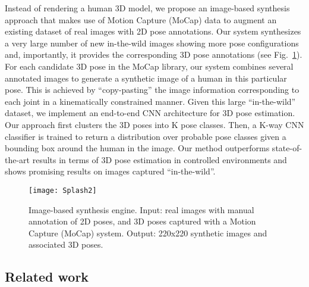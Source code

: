 \documentclass{article}
\begin{document}
Instead of rendering a human 3D model, we propose
an image-based synthesis approach that makes use of Motion Capture
(MoCap) data to augment an existing dataset of real images with 2D
pose annotations. Our system synthesizes a very large number of new
in-the-wild images showing more pose configurations and, importantly,
it provides the corresponding 3D pose annotations (see
Fig.~\ref{fig:dataset}).
For each candidate 3D pose in the MoCap library, our system combines
several annotated images to generate a synthetic image of a human in
this particular pose. This is achieved  by ``copy-pasting'' the image
information corresponding to each joint in a kinematically constrained manner.
Given this large ``in-the-wild'' dataset, we implement an end-to-end
CNN architecture for 3D pose estimation. Our approach first clusters
the 3D poses into K pose classes. Then, a K-way CNN
classifier is trained to return a distribution over probable pose
classes given a bounding box around the human in the image. Our method
outperforms state-of-the-art results in terms of 3D pose estimation in
controlled environments and shows promising results on images captured
``in-the-wild''. 
 \vspace{-2mm}\begin{figure}[htb]
   \centering
\texttt{[image: Splash2]}
   \vspace{-7mm}\caption{\footnotesize Image-based synthesis engine. Input: real images with manual annotation of 2D poses, and 3D poses
     captured with a Motion Capture (MoCap) system.  Output:
     220x220 synthetic images and associated 3D poses.
}

     \label{fig:dataset}
 \end{figure}
\vspace{-3mm}
 



























 

\subsection{Related work}
\end{document}
